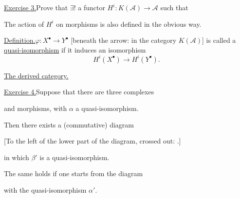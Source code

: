 \underline{Exercise 3.}\quad Prove that $\exists!$ a functor
$H^i\colon K(\mathcal A)\longrightarrow\mathcal A$ such that
\begin{center}
\end{center}
The action of $H^i$ on morphisms is also defined in the obvious way.

\underline{Definition.}\quad $\varphi\colon X^\bullet\longrightarrow Y^\bullet$
[beneath the arrow: in the category $K(\mathcal A)$]
is called a \underline{quasi-isomorphism} if it induces an isomorphism
\begin{equation*}
H^i(X^\bullet)\longrightarrow H^i(Y^\bullet).
\end{equation*}

\underline{The derived category.}

\underline{Exercise 4.}\quad Suppose that there are three complexes
\begin{center}
\end{center}
and morphisms, with $\alpha$ a quasi-isomorphism.

Then there exists a (commutative) diagram
\begin{center}
\end{center}
[To the left of the lower part of the diagram, crossed out:
.]

in which $\beta'$ is a quasi-isomorphism.

The same holds if one starts from the diagram
\begin{center}
\end{center}
with the quasi-isomorphism $\alpha'$.



